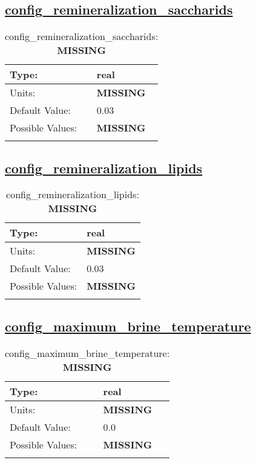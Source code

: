 \subsection[config\_remineralization\_saccharids]{\hyperref[sec:nm_tab_biogeochemistry]{config\_remineralization\_saccharids}}
\label{subsec:nm_sec_config_remineralization_saccharids}
\begin{center}
\begin{longtable}{| p{2.0in} || p{4.0in} |}
    \hline
    Type: & real \\
    \hline
    Units: & {\bf \color{red} MISSING} \\
    \hline
    Default Value: & 0.03 \\
    \hline
    Possible Values: & {\bf \color{red} MISSING} \\
    \hline
    \caption{config\_remineralization\_saccharids: {\bf \color{red} MISSING}}
\end{longtable}
\end{center}
\subsection[config\_remineralization\_lipids]{\hyperref[sec:nm_tab_biogeochemistry]{config\_remineralization\_lipids}}
\label{subsec:nm_sec_config_remineralization_lipids}
\begin{center}
\begin{longtable}{| p{2.0in} || p{4.0in} |}
    \hline
    Type: & real \\
    \hline
    Units: & {\bf \color{red} MISSING} \\
    \hline
    Default Value: & 0.03 \\
    \hline
    Possible Values: & {\bf \color{red} MISSING} \\
    \hline
    \caption{config\_remineralization\_lipids: {\bf \color{red} MISSING}}
\end{longtable}
\end{center}
\subsection[config\_maximum\_brine\_temperature]{\hyperref[sec:nm_tab_biogeochemistry]{config\_maximum\_brine\_temperature}}
\label{subsec:nm_sec_config_maximum_brine_temperature}
\begin{center}
\begin{longtable}{| p{2.0in} || p{4.0in} |}
    \hline
    Type: & real \\
    \hline
    Units: & {\bf \color{red} MISSING} \\
    \hline
    Default Value: & 0.0 \\
    \hline
    Possible Values: & {\bf \color{red} MISSING} \\
    \hline
    \caption{config\_maximum\_brine\_temperature: {\bf \color{red} MISSING}}
\end{longtable}
\end{center}
